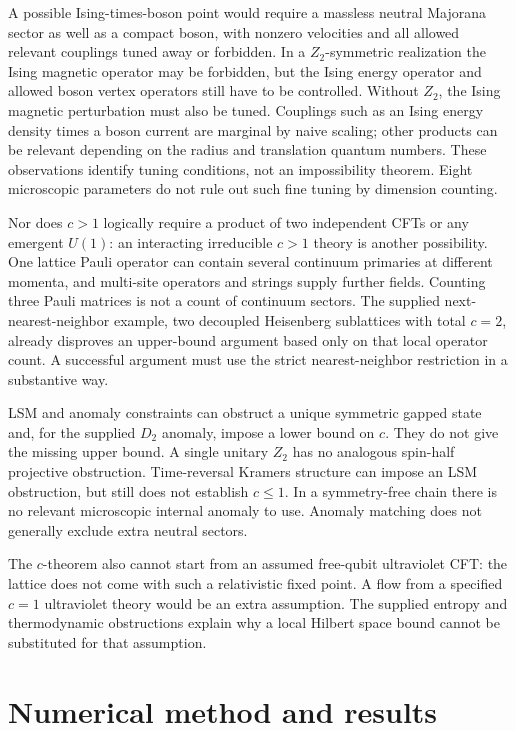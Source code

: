 \documentclass[11pt]{article}
\begin{document}
A possible Ising-times-boson point would require a massless neutral Majorana
sector as well as a compact boson, with nonzero velocities and all allowed
relevant couplings tuned away or forbidden. In a $Z_2$-symmetric realization
the Ising magnetic operator may be forbidden, but the Ising energy operator
and allowed boson vertex operators still have to be controlled. Without
$Z_2$, the Ising magnetic perturbation must also be tuned. Couplings such as
an Ising energy density times a boson current are marginal by naive scaling;
other products can be relevant depending on the radius and translation
quantum numbers. These observations identify tuning conditions, not an
impossibility theorem. Eight microscopic parameters do not rule out such
fine tuning by dimension counting.

Nor does $c>1$ logically require a product of two independent CFTs or any
emergent $U(1)$: an interacting irreducible $c>1$ theory is another possibility.
One lattice Pauli operator can contain several continuum primaries at
different momenta, and multi-site operators and strings supply further
fields. Counting three Pauli matrices is not a count of continuum sectors.
The supplied next-nearest-neighbor example, two decoupled Heisenberg
sublattices with total $c=2$, already disproves an upper-bound argument based
only on that local operator count. A successful argument must use the strict
nearest-neighbor restriction in a substantive way.

LSM and anomaly constraints can obstruct a unique symmetric gapped state
and, for the supplied $D_2$ anomaly, impose a lower bound on $c$. They do not
give the missing upper bound. A single unitary $Z_2$ has no analogous
spin-half projective obstruction. Time-reversal Kramers structure can impose
an LSM obstruction, but still does not establish $c\le1$. In a symmetry-free
chain there is no relevant microscopic internal anomaly to use. Anomaly
matching does not generally exclude extra neutral sectors.

The $c$-theorem also cannot start from an assumed free-qubit ultraviolet CFT:
the lattice does not come with such a relativistic fixed point. A flow from
a specified $c=1$ ultraviolet theory would be an extra assumption. The
supplied entropy and thermodynamic obstructions explain why a local Hilbert
space bound cannot be substituted for that assumption.

\section{Numerical method and results}
\end{document}
